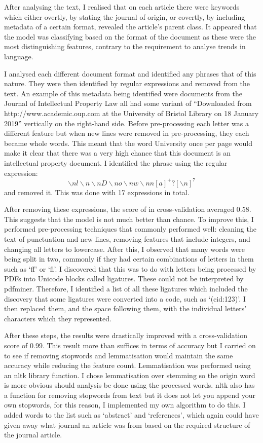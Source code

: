 				After analysing the text, I realised that on each article there were keywords which either overtly, by stating the journal of origin, or covertly, by including metadata of a certain format, revealed the article's parent class. It appeared that the model was classifying based on the format of the document as these were the most distinguishing features, contrary to the requirement to analyse trends in language.  
				
				I analysed each different document format and identified any phrases that of this nature. They were then identified by regular expressions and removed from the text. An example of this metadata being identified were documents from the Journal of Intellectual Property Law all had some variant of ``Downloaded from http://www.academic.oup.com at the University of Bristol Library on 18 January 2019'' vertically on the right-hand side. Before pre-processing each letter was a different feature but when new lines were removed in pre-processing, they each became whole words. This meant that the word University once per page would make it clear that there was a very high chance that this document is an intellectual property document. I identified the phrase using the regular expression: \[\backslash nl\backslash n\backslash nD\backslash no\backslash nw\backslash nn[a]^+?[\backslash n ]^{7}\] and removed it. This was done with 17 expressions in total.
				
				After removing these expressions, the score of in cross-validation averaged 0.58. This suggests that the model is not much better than chance. To improve this, I performed pre-processing techniques that commonly performed well: cleaning the text of punctuation and new lines, removing features that include integers, and changing all letters to lowercase. After this, I observed that many words were being split in two, commonly if they had certain combinations of letters in them such as `ff' or `fi'. I discovered that this was to do with letters being processed by PDFs into Unicode blocks called ligatures. These could not be interpreted by pdfminer. Therefore, I identified a list of all these ligatures which included the discovery that some ligatures were converted into a code, such as `(cid:123)'. I then replaced them, and the space following them, with the individual letters' characters which they represented. 
				
				After these steps, the results were drastically improved with a cross-validation score of 0.99. This result more than suffices in terms of accuracy but I carried on to see if removing stopwords and lemmatisation would maintain the same accuracy while reducing the feature count. Lemmatisation was performed using an nltk library function. I chose lemmatisation over stemming so the origin word is more obvious should analysis be done using the processed words. nltk also has a function for removing stopwords from text but it does not let you append your own stopwords, for this reason, I implemented my own algorithm to do this. I added words to the list such as `abstract' and `references', which again could have given away what journal an article was from based on the required structure of the journal article.
				
